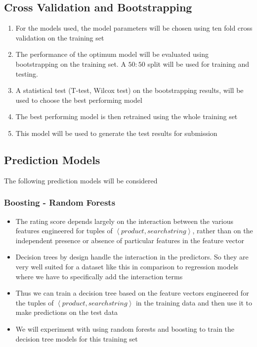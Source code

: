 \documentclass[twoside,12pt]{article}
\newcommand{\tuple}[1]{\ensuremath{\left \langle #1 \right \rangle }}
\begin{document}
\subsection{Cross Validation and Bootstrapping}
\begin{enumerate}
\item
For the models used, the model parameters will be chosen using ten fold cross validation on the training set 
\item
The performance of the optimum model will be evaluated using bootstrapping on the training set. A $50:50$ split will be used for training and testing. 
\item
A statistical test (T-test, Wilcox test) on the bootstrapping results, will be used to choose the best performing model
\item
The best performing model is then retrained using the whole training set
\item
This model will be used to generate the test results for submission
\end{enumerate}



\subsection{Prediction Models}
The following prediction models will be considered

\subsubsection{Boosting - Random Forests}
\begin{itemize}
\item
The rating score depends largely on the interaction between the various features engineered for tuples of \tuple{product,searchstring}, rather than on the independent presence or absence of particular features in the feature vector
\item
Decision trees by design handle the interaction in the predictors. So they are very well suited for a dataset like this in comparison to regression models where we have to specifically add the interaction terms
\item
Thus we can train a decision tree based on the feature vectors engineered for the tuples of \tuple{product,searchstring} in the training data and then use it to make predictions on the test data 
\item
We will experiment with using random forests and boosting to train the decision tree models for this training set
\end{itemize}
\end{document}
